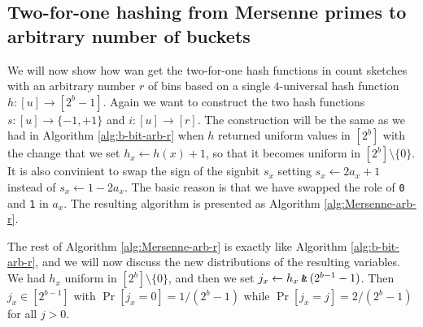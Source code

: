 \subsection{Two-for-one hashing from Mersenne primes to arbitrary number of buckets}
We will now show how wan get the two-for-one hash functions in count
sketches with an arbitrary number $r$ of bins based on a single
$4$-universal hash function $h:[u]\to [2^b-1]$.  Again we want to
construct the two hash functions $s:[u]\to\{-1,+1\}$ and
$i:[u]\to[r]$.  The construction will be the same as we had in
Algorithm \ref{alg:b-bit-arb-r} when $h$ returned uniform values in
$[2^b]$ with the change that we set $h_x\gets h(x)+1$, so that it
becomes uniform in $[2^b]\setminus\{0\}$. It is also convinient to
swap the sign of the signbit $s_x$ setting $s_x\gets 2a_x+1$ instead
of $s_x\gets 1-2a_x$. The basic reason is that we have swapped the
role of \texttt{0} and \texttt{1} in $a_x$.  The resulting algorithm
is presented as Algorithm \ref{alg:Mersenne-arb-r}.
The rest of Algorithm \ref{alg:Mersenne-arb-r} is exactly like 
Algorithm \ref{alg:b-bit-arb-r}, and we will now discuss the new
distributions of the resulting variables. We had
$h_x$ uniform in $[2^b]\setminus\{0\}$, and then we set
$j_x \gets h_x\mathbin{\texttt{\&}}(2^{b-1}-1)$. Then $j_x\in[2^{b-1}]$ with 
$\Pr[j_x=0]=1/(2^{b}-1)$ while  $\Pr[j_x=j]=2/(2^{b}-1)$ for all $j>0$.

